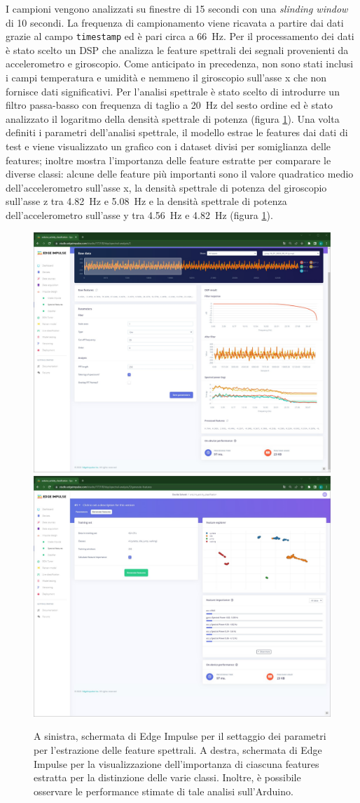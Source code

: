 I campioni vengono analizzati su finestre di 15 secondi con una \textit{slinding window} di 10 secondi. La frequenza di campionamento viene ricavata a partire dai dati grazie al campo \texttt{timestamp} ed è pari circa a \SI{66}{\hertz}.
Per il processamento dei dati è stato scelto un DSP che analizza le feature spettrali dei segnali provenienti da accelerometro e giroscopio. Come anticipato in precedenza, non sono stati inclusi i campi temperatura e umidità e nemmeno il giroscopio sull'asse x che non fornisce dati significativi.
Per l'analisi spettrale è stato scelto di introdurre un filtro passa-basso con frequenza di taglio a \SI{20}{\hertz} del sesto ordine ed è stato analizzato il logaritmo della densità spettrale di potenza (figura \ref{fig:spectral_feature}). Una volta definiti i parametri dell'analisi spettrale, il modello estrae le features dai dati di test e viene visualizzato un grafico con i dataset divisi per somiglianza delle features; inoltre mostra l'importanza delle feature estratte per comparare le diverse classi: alcune delle feature più importanti sono il valore quadratico medio dell'accelerometro sull'asse x, la densità spettrale di potenza del giroscopio sull'asse z tra \SI{4.82}{\hertz} e \SI{5.08}{\hertz} e la densità spettrale di potenza dell'accelerometro sull'asse y tra \SI{4.56}{\hertz} e \SI{4.82}{\hertz} (figura \ref{fig:spectral_feature}). 
\begin{figure}[h!]
	\centering
	\includegraphics[width=0.49\linewidth]{./ImageFiles/spectral_features.jpg}
	\includegraphics[width=0.49\linewidth]{./ImageFiles/features_extracted.jpg}
	\caption{A sinistra, schermata di Edge Impulse per il settaggio dei parametri per l'estrazione delle feature spettrali. A destra, schermata di Edge Impulse per la visualizzazione dell'importanza di ciascuna features estratta per la distinzione delle varie classi. Inoltre, è possibile osservare le performance stimate di tale analisi sull'Arduino.}
	\label{fig:spectral_feature}
\end{figure}

